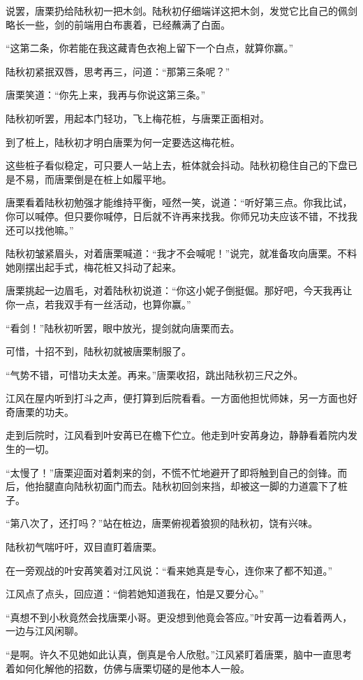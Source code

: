 说罢，唐栗扔给陆秋初一把木剑。陆秋初仔细端详这把木剑，发觉它比自己的佩剑略长一些，剑的前端用白布裹着，已经蘸满了白面。

“这第二条，你若能在我这藏青色衣袍上留下一个白点，就算你赢。”

陆秋初紧抿双唇，思考再三，问道：“那第三条呢？”

唐栗笑道：“你先上来，我再与你说这第三条。”

陆秋初听罢，用起本门轻功，飞上梅花桩，与唐栗正面相对。

到了桩上，陆秋初才明白唐栗为何一定要选这梅花桩。

这些桩子看似稳定，可只要人一站上去，桩体就会抖动。陆秋初稳住自己的下盘已是不易，而唐栗倒是在桩上如履平地。 

唐栗看着陆秋初勉强才能维持平衡，哑然一笑，说道：“听好第三点。你我比试，你可以喊停。但只要你喊停，日后就不许再来找我。你师兄功夫应该不错，不找我还可以找他嘛。”

陆秋初皱紧眉头，对着唐栗喊道：“我才不会喊呢！”说完，就准备攻向唐栗。不料她刚摆出起手式，梅花桩又抖动了起来。

唐栗挑起一边眉毛，对着陆秋初说道：“你这小妮子倒挺倔。那好吧，今天我再让你一点，若我双手有一丝活动，也算你赢。”

“看剑！”陆秋初听罢，眼中放光，提剑就向唐栗而去。

可惜，十招不到，陆秋初就被唐栗制服了。

“气势不错，可惜功夫太差。再来。”唐栗收招，跳出陆秋初三尺之外。

江风在屋内听到打斗之声，便打算到后院看看。一方面他担忧师妹，另一方面也好奇唐栗的功夫。

走到后院时，江风看到叶安苒已在檐下伫立。他走到叶安苒身边，静静看着院内发生的一切。

“太慢了！”唐栗迎面对着刺来的剑，不慌不忙地避开了即将触到自己的剑锋。而后，他抬腿直向陆秋初面门而去。陆秋初回剑来挡，却被这一脚的力道震下了桩子。

“第八次了，还打吗？”站在桩边，唐栗俯视着狼狈的陆秋初，饶有兴味。

陆秋初气喘吁吁，双目直盯着唐栗。

在一旁观战的叶安苒笑着对江风说：“看来她真是专心，连你来了都不知道。”

江风点了点头，回应道：“倘若她知道我在，怕是又要分心。”

“真想不到小秋竟然会找唐栗小哥。更没想到他竟会答应。”叶安苒一边看着两人，一边与江风闲聊。

“是啊。许久不见她如此认真，倒真是令人欣慰。”江风紧盯着唐栗，脑中一直思考着如何化解他的招数，仿佛与唐栗切磋的是他本人一般。


